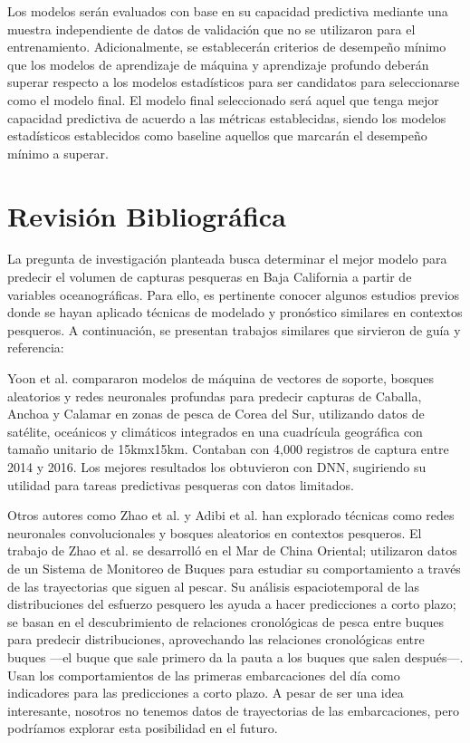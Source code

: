 \documentclass[twoside,11pt]{article}
\begin{document}
Los modelos serán evaluados con base en su capacidad predictiva mediante una muestra independiente de datos de validación que no se utilizaron para el entrenamiento. Adicionalmente, se establecerán criterios de desempeño mínimo que los modelos de aprendizaje de máquina y aprendizaje profundo deberán superar respecto a los modelos estadísticos para ser candidatos para seleccionarse como el modelo final. 
El modelo final seleccionado será aquel que tenga mejor capacidad predictiva de acuerdo a las métricas establecidas, siendo los modelos estadísticos establecidos como baseline aquellos que marcarán el desempeño mínimo a superar.

\section{Revisión Bibliográfica}

La pregunta de investigación planteada busca determinar el mejor modelo para predecir el volumen de capturas pesqueras en Baja California a partir de variables oceanográficas. Para ello, es pertinente conocer algunos estudios previos donde se hayan aplicado técnicas de modelado y pronóstico similares en contextos pesqueros. A continuación, se presentan trabajos similares que sirvieron de guía y referencia:


Yoon et al. \cite{yoon2020} compararon modelos de máquina de vectores de soporte, bosques aleatorios y redes neuronales profundas para predecir capturas de Caballa, Anchoa y Calamar en zonas de pesca de Corea del Sur, utilizando datos de satélite, oceánicos y climáticos integrados en una cuadrícula geográfica con tamaño unitario de 15kmx15km. Contaban con 4,000 registros de captura entre 2014 y 2016. Los mejores resultados los obtuvieron con DNN, sugiriendo su utilidad para tareas predictivas pesqueras con datos limitados.


Otros autores como Zhao et al.\cite{zhao2021} y Adibi et al.\cite{adibi2020} han explorado técnicas como redes neuronales convolucionales y bosques aleatorios en contextos pesqueros. El trabajo de Zhao et al. se desarrolló en el Mar de China Oriental; utilizaron datos de un Sistema de Monitoreo de Buques para estudiar su comportamiento a través de las trayectorias que siguen al pescar. Su análisis espaciotemporal de las distribuciones del esfuerzo pesquero les ayuda a hacer predicciones a corto plazo; se basan en el descubrimiento de relaciones cronológicas de pesca entre buques para predecir distribuciones, aprovechando las relaciones cronológicas entre buques —el buque que sale primero da la pauta a los buques que salen después—. Usan los comportamientos de las primeras embarcaciones del día como indicadores para las predicciones a corto plazo. A pesar de ser una idea interesante, nosotros no tenemos datos de trayectorias de las embarcaciones, pero podríamos explorar esta posibilidad en el futuro. 
\end{document}
